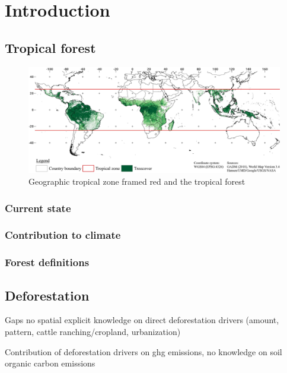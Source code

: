 \section{Introduction}
\label{sec:introduction}

\subsection{Tropical forest}
	\begin{figure}[h]
		\centering
		\includegraphics[scale=0.95]{img/intro_overview_frameless}
		\caption[Study extent]{Geographic tropical zone framed red and the tropical forest}
		\label{fig:intro_overview}
	\end{figure}

	\subsubsection{Current state}
		\lipsum[1-3]

	\subsubsection{Contribution to climate}
	\subsubsection{Forest definitions}

\subsection{Deforestation}
	{\color{red} Gaps no spatial explicit knowledge on direct deforestation drivers (amount, pattern, cattle ranching/cropland, urbanization)}

	{\color{red} Contribution of deforestation drivers on ghg emissions, no knowledge on soil organic carbon emissions} 
